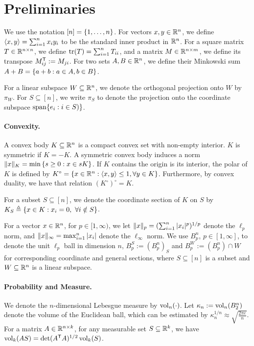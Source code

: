 \section{Preliminaries}
\label{sec:prelims}

We use the notation $[n] = \left\{ 1,\dots,n \right\}$. For vectors $x,y \in {\mathbb{R}}^n$, we
define $\langle x, y \rangle = \sum_{i=1}^n x_i y_i$ to be the standard inner product in
${\mathbb{R}}^n$. For a square matrix $T \in {\mathbb{R}}^{n \times n}$, we define $\operatorname{tr}(T) =
\sum_{i=1}^n T_{ii}$, and a matrix $M \in {\mathbb{R}}^{n \times m}$, we define its
transpose $M^\mathsf T_{ij} := M_{ji}$. For two sets $A,B \in {\mathbb{R}}^n$, we define their
Minkowski sum $A+B = \left\{ a+b: a \in A,b \in B \right\}$.

For a linear subspace $W \subseteq {\mathbb{R}}^n$, we denote the orthogonal projection
onto $W$ by $\pi_W$. For $S \subseteq [n]$, we write $\pi_S$ to denote the
projection onto the coordinate subspace $\operatorname{span}\{e_i: i \in S)\}$.

\paragraph{\bf Convexity.} A convex body $K \subseteq {\mathbb{R}}^n$ is a compact convex
set with non-empty interior. $K$ is symmetric if $K = -K$. A symmetric convex
body induces a norm $\lVert x\rVert_K = \min \left\{ s \geq 0: x \in sK \right\}$. If $K$
contains the origin is its interior, the polar of $K$ is defined by $K^\circ =
\left\{ x \in {\mathbb{R}}^n: \langle x, y \rangle \leq 1, \forall y \in K \right\}$. Furthermore, by convex
duality, we have that relation $(K^{\circ})^\circ = K$. 

For a subset $S \subseteq [n]$, we denote the coordinate section of $K$ on $S$
by $K_S \triangleq \left\{ x \in K: x_i = 0, ~\forall i \notin S \right\}$. 

For a vector $x \in {\mathbb{R}}^n$, for $p \in [1,\infty)$, we let $\lVert x\rVert_p =
(\sum_{i=1}^n |x_i|^p)^{1/p}$ denote the $\ell_p$ norm, and $\lVert x\rVert_\infty =
\max_{i=1}^n |x_i|$ denote the $\ell_\infty$ norm. We use $B_p^n$, $p \in
[1,\infty]$, to denote the unit $\ell_p$ ball in dimension $n$, $B_p^S :=
(B_p^n)_S$ and $B_p^W := (B_p^n) \cap W$ for corresponding coordinate and
general sections, where $S \subseteq [n]$ is a subset and $W \subseteq {\mathbb{R}}^n$ is
a linear subspace. 

\paragraph{\bf Probability and Measure.} We denote the $n$-dimensional Lebesgue
measure by $\operatorname{vol}_n(\cdot)$. Let $\kappa_n := \operatorname{vol}_n(B_2^n)$ denote the volume
of the Euclidean ball, which can be estimated by $\kappa_n^{1/n} \approx
\sqrt{\frac{2\pi e}{n}}$. For a matrix $A \in {\mathbb{R}}^{n \times k}$, for any
measurable set $S \subseteq {\mathbb{R}}^k$, we have $\operatorname{vol}_k(A S) = \det(A^\mathsf T A)^{1/2}
\operatorname{vol}_k(S)$.  


